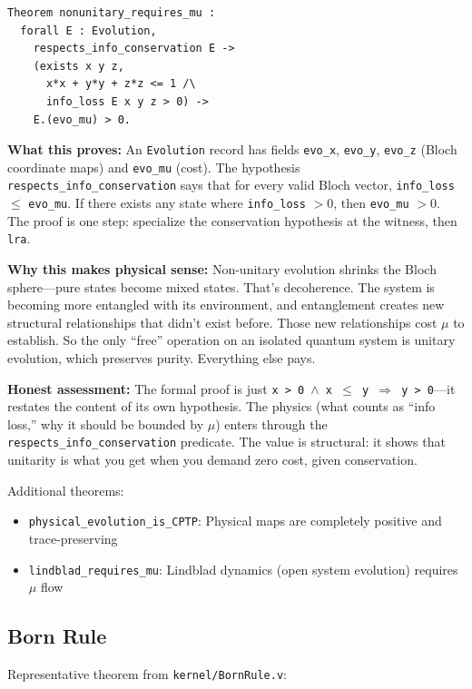 \begin{lstlisting}
Theorem nonunitary_requires_mu :
  forall E : Evolution,
    respects_info_conservation E ->
    (exists x y z,
      x*x + y*y + z*z <= 1 /\
      info_loss E x y z > 0) ->
    E.(evo_mu) > 0.
\end{lstlisting}

\textbf{What this proves:} An \texttt{Evolution} record has fields \texttt{evo\_x}, \texttt{evo\_y}, \texttt{evo\_z} (Bloch coordinate maps) and \texttt{evo\_mu} (cost). The hypothesis \texttt{respects\_info\_conservation} says that for every valid Bloch vector, \texttt{info\_loss} $\leq$ \texttt{evo\_mu}. If there exists any state where \texttt{info\_loss} $> 0$, then \texttt{evo\_mu} $> 0$. The proof is one step: specialize the conservation hypothesis at the witness, then \texttt{lra}.

\textbf{Why this makes physical sense:} Non-unitary evolution shrinks the Bloch sphere---pure states become mixed states. That's decoherence. The system is becoming more entangled with its environment, and entanglement creates new structural relationships that didn't exist before. Those new relationships cost $\mu$ to establish. So the only ``free'' operation on an isolated quantum system is unitary evolution, which preserves purity. Everything else pays.

\textbf{Honest assessment:} The formal proof is just \texttt{x > 0 $\wedge$ x $\leq$ y $\Rightarrow$ y > 0}---it restates the content of its own hypothesis. The physics (what counts as ``info loss,'' why it should be bounded by $\mu$) enters through the \texttt{respects\_info\_conservation} predicate. The value is structural: it shows that unitarity is what you get when you demand zero cost, given conservation.

Additional theorems:
\begin{itemize}
    \item \texttt{physical\_evolution\_is\_CPTP}: Physical maps are completely positive and trace-preserving
    \item \texttt{lindblad\_requires\_mu}: Lindblad dynamics (open system evolution) requires $\mu$ flow
\end{itemize}

\subsection{Born Rule}

Representative theorem from \texttt{kernel/BornRule.v}:

